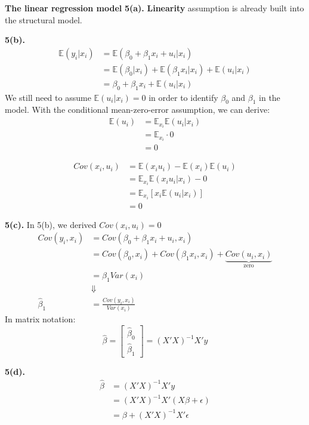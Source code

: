 \documentclass[UTF8]{ctexart}
\begin{document}
\newpage
\Large\textbf{The linear regression model}\newline
\textbf{5(a).}\newline
\textbf{Linearity} assumption is already built into the structural model.
\bigskip

\textbf{5(b).}
\begin{align*}
\mathbb{E}(y_i|x_i)&=\mathbb{E}(\beta_0+\beta_1x_i+u_i|x_i) \\
&=\mathbb{E}(\beta_0|x_i)+\mathbb{E}(\beta_1x_i|x_i)+\mathbb{E}(u_i|x_i) \\
&=\beta_0+\beta_1x_i+\mathbb{E}(u_i|x_i)
\end{align*}
We still need to assume $\mathbb{E}(u_i|x_i)=0$ in order to identify $\beta_0$ and $\beta_1$ 
in the model. With the conditional mean-zero-error assumption, we can derive:
\begin{align*}
\mathbb{E}(u_i)&=\mathbb{E}_{x_i}\mathbb{E}(u_i|x_i) \\
&=\mathbb{E}_{x_i} \cdot 0 \\
&=0
\end{align*}

\begin{align*}
Cov(x_i,u_i)&=\mathbb{E}(x_iu_i)-\mathbb{E}(x_i)\mathbb{E}(u_i) \\
&=\mathbb{E}_{x_i}\mathbb{E}(x_iu_i|x_i)-0 \\
&=\mathbb{E}_{x_i}[x_i\mathbb{E}(u_i|x_i)] \\
&=0
\end{align*}
\bigskip

\textbf{5(c).}\newline
In 5(b), we derived $Cov(x_i,u_i)=0$
\begin{align*}
Cov(y_i,x_i)&=Cov(\beta_0+\beta_1x_i+u_i,x_i) \\
&=Cov(\beta_0,x_i)+Cov(\beta_1x_i,x_i)+\underbrace{Cov(u_i,x_i)}_{\text{zero}} \\
&=\beta_1Var(x_i) \\
&\Downarrow \\
\hat{\beta}_1&=\frac{Cov(y_i,x_i)}{Var(x_i)}
\end{align*}
In matrix notation:
\[\hat{\beta} =
\begin{bmatrix}
    \hat{\beta}_0 \\
    \hat{\beta}_1
\end{bmatrix}
= (X'X)^{-1}X'y \]
\bigskip

\textbf{5(d).}
\begin{align*}
    \hat{\beta} &= (X'X)^{-1}X'y \\
    &=(X'X)^{-1}X'(X\beta+\epsilon) \\
    &=\beta+(X'X)^{-1}X'\epsilon
\end{align*}
\end{document}
